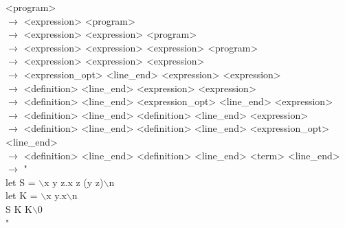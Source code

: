 \documentclass[12pt]{article}
\begin{document}
<program> \\
$\rightarrow$ <expression> <program> \\
$\rightarrow$ <expression> <expression> <program> \\
$\rightarrow$ <expression> <expression> <expression> <program> \\
$\rightarrow$ <expression> <expression> <expression> \\
$\rightarrow$ <expression\_opt> <line\_end> <expression> <expression> \\
$\rightarrow$ <definition> <line\_end> <expression> <expression> \\
$\rightarrow$ <definition> <line\_end> <expression\_opt> <line\_end> <expression> \\
$\rightarrow$ <definition> <line\_end> <definition> <line\_end> <expression> \\
$\rightarrow$ <definition> <line\_end> <definition> <line\_end> <expression\_opt> <line\_end> \\
$\rightarrow$ <definition> <line\_end> <definition> <line\_end> <term> <line\_end> \\
$\rightarrow$ " \\
let S = $\backslash$x y z.x z (y z)$\backslash$n \\
let K = $\backslash$x y.x$\backslash$n \\
S K K$\backslash$0 \\
"
\end{document}
